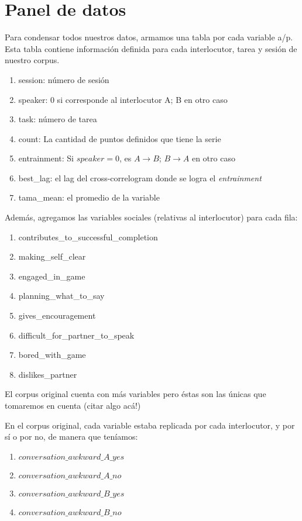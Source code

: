 \section{Panel de datos}
\label{sec:panel_data}

Para condensar todos nuestros datos, armamos una tabla por cada variable a/p. Esta tabla contiene información definida para cada interlocutor, tarea y sesión de nuestro corpus.

\begin{enumerate}
  \item session: número de sesión
  \item speaker: 0 si corresponde al interlocutor A; B en otro caso
  \item task: número de tarea
  \item count: La cantidad de puntos definidos que tiene la serie
  \item entrainment: Si $speaker=0$, es $A\rightarrow B$; $B \rightarrow A$ en otro caso
  \item best\_lag: el lag del cross-correlogram donde se logra el \emph{entrainment}
  \item tama\_mean: el promedio de la variable
\end{enumerate}

Además, agregamos las variables sociales (relativas al interlocutor) para cada fila:

\begin{enumerate}
\item contributes\_to\_successful\_completion
\item making\_self\_clear
\item engaged\_in\_game
\item planning\_what\_to\_say
\item gives\_encouragement
\item difficult\_for\_partner\_to\_speak
\item bored\_with\_game
\item dislikes\_partner
\end{enumerate}

El corpus original cuenta con más variables pero éstas son las únicas que tomaremos en cuenta (citar algo acá!)

En el corpus original, cada variable estaba replicada por cada interlocutor, y por sí o por no, de manera que teníamos:

\begin{enumerate}
  \item $conversation\_awkward\_A\_yes$
  \item $conversation\_awkward\_A\_no$
  \item $conversation\_awkward\_B\_yes$
  \item $conversation\_awkward\_B\_no$
\end{enumerate}


